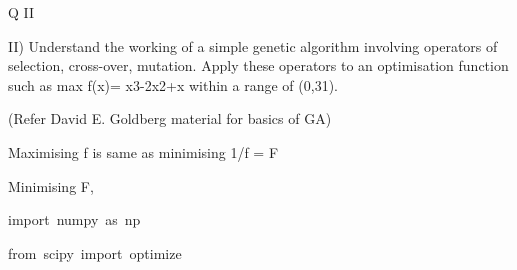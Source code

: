\documentclass[12pt]{article}
\renewcommand{\_}{\kern-1.5pt\textunderscore\kern-1.5pt}
\begin{document}
\vspace{\baselineskip}

\vspace{\baselineskip}

\vspace{\baselineskip}

\vspace{\baselineskip}

\vspace{\baselineskip}

\vspace{\baselineskip}

\vspace{\baselineskip}

\vspace{\baselineskip}

\vspace{\baselineskip}
\begin{Center}
{\fontsize{28pt}{33.6pt}\selectfont Q II\par}
\end{Center}\par

{\fontsize{14pt}{16.8pt}\selectfont II) Understand the working of a simple genetic algorithm involving operators of selection, cross-over, mutation. Apply these operators to an optimisation function such as max f(x)= x3-2x2+x within a range of (0,31).\par}\par

{\fontsize{14pt}{16.8pt}\selectfont (Refer David E. Goldberg material for basics of GA)\par}\par


\vspace{\baselineskip}
{\fontsize{14pt}{16.8pt}\selectfont Maximising f is same as minimising 1/f = F\par}\par

{\fontsize{14pt}{16.8pt}\selectfont Minimising F, \par}\par

\setlength{\parskip}{0.0pt}
{\fontsize{10pt}{12.0pt}\selectfont \textcolor[HTML]{C586C0}{import numpy as np}\par}\par

{\fontsize{10pt}{12.0pt}\selectfont \textcolor[HTML]{C586C0}{from scipy import optimize}\par}\par
\end{document}
